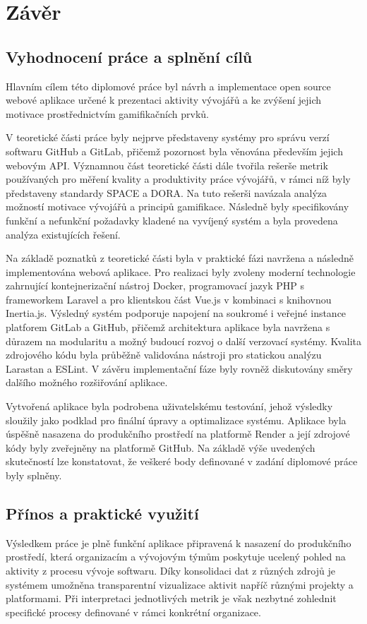 \chapter{Závěr}

\section{Vyhodnocení práce a splnění cílů}
Hlavním cílem této diplomové práce byl návrh a implementace open source webové aplikace určené k prezentaci aktivity vývojářů a ke zvýšení jejich motivace prostřednictvím gamifikačních prvků.

V teoretické části práce byly nejprve představeny systémy pro správu verzí softwaru GitHub a GitLab, přičemž pozornost byla věnována především jejich webovým API. Významnou část teoretické části dále tvořila rešerše metrik používaných pro měření kvality a produktivity práce vývojářů, v rámci níž byly představeny standardy SPACE a DORA. Na tuto rešerši navázala analýza možností motivace vývojářů a principů gamifikace. Následně byly specifikovány funkční a nefunkční požadavky kladené na vyvíjený systém a byla provedena analýza existujících řešení.

Na základě poznatků z teoretické části byla v praktické fázi navržena a následně implementována webová aplikace. Pro realizaci byly zvoleny moderní technologie zahrnující kontejnerizační nástroj Docker, programovací jazyk PHP s frameworkem Laravel a pro klientskou část Vue.js v kombinaci s knihovnou Inertia.js. Výsledný systém podporuje napojení na soukromé i veřejné instance platforem GitLab a GitHub, přičemž architektura aplikace byla navržena s důrazem na modularitu a možný budoucí rozvoj o další verzovací systémy. Kvalita zdrojového kódu byla průběžně validována nástroji pro statickou analýzu Larastan a ESLint. V závěru implementační fáze byly rovněž diskutovány směry dalšího možného rozšiřování aplikace.

Vytvořená aplikace byla podrobena uživatelskému testování, jehož výsledky sloužily jako podklad pro finální úpravy a optimalizace systému. Aplikace byla úspěšně nasazena do produkčního prostředí na platformě Render a její zdrojové kódy byly zveřejněny na platformě GitHub. Na základě výše uvedených skutečností lze konstatovat, že veškeré body definované v zadání diplomové práce byly splněny.

\section{Přínos a praktické využití}
Výsledkem práce je plně funkční aplikace připravená k nasazení do produkčního prostředí, která organizacím a vývojovým týmům poskytuje ucelený pohled na aktivity z procesu vývoje softwaru. Díky konsolidaci dat z různých zdrojů je systémem umožněna transparentní vizualizace aktivit napříč různými projekty a platformami. Při interpretaci jednotlivých metrik je však nezbytné zohlednit specifické procesy definované v rámci konkrétní organizace.

